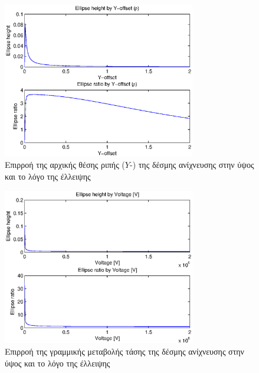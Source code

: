 \begin{figure}[tbh]
\includegraphics[width=0.75\textwidth]{figures/beam_deflection_script_05_elipse_ratio_by_bunch_intensity}
\centering
\caption[Επιρροή της αρχικής θέσης ριπής της δέσμης ανίχνευσης στην ύψος και το λόγο της έλλειψης]{Επιρροή της αρχικής θέσης ριπής ($Y$-) της δέσμης ανίχνευσης στην ύψος και το λόγο της έλλειψης}
\label{fig:beam_deflection_script_05_elipse_ratio_by_bunch_intensity}
\end{figure}

\begin{figure}[tbh]
\includegraphics[width=0.75\textwidth]{figures/beam_deflection_script_06}
\centering
\caption{Επιρροή της γραμμικής μεταβολής τάσης της δέσμης ανίχνευσης στην ύψος και το λόγο της έλλειψης}
\label{fig:beam_deflection_script_06}
\end{figure}

